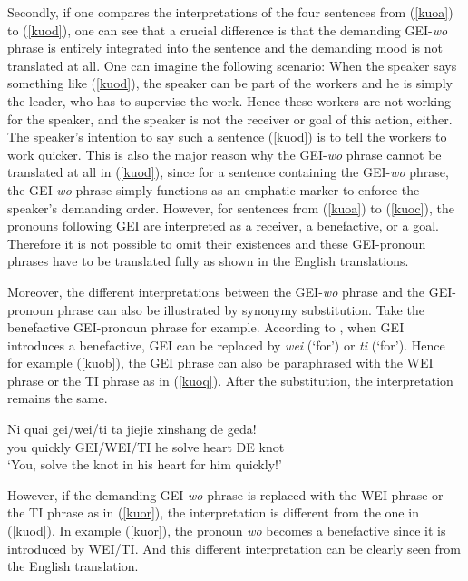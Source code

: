 \documentclass[output=paper,colorlinks,citecolor=brown]{langscibook}
\begin{document}
Secondly, if one compares the interpretations of the four sentences from (\ref{kuoa}) to (\ref{kuod}), one can see that a crucial difference is that the demanding GEI-\textit{wo} phrase is entirely integrated into the sentence and the demanding mood is not translated at all. One can imagine the following scenario: When the speaker says something like (\ref{kuod}), the speaker can be part of the workers and he is simply the leader, who has to supervise the work. Hence these workers are not working for the speaker, and the speaker is not the receiver or goal of this action, either. The speaker's intention to say such a sentence (\ref{kuod}) is to tell the workers to work quicker. This is also the major reason why the GEI-\textit{wo} phrase cannot be translated at all in (\ref{kuod}), since for a sentence containing the GEI-\textit{wo} phrase, the GEI-\textit{wo} phrase simply functions as an emphatic marker to enforce the speaker's demanding order. However, for sentences from (\ref{kuoa}) to (\ref{kuoc}), the pronouns following GEI are interpreted as a receiver, a benefactive, or a goal. Therefore it is not possible to omit their existences and these GEI-pronoun phrases have to be translated fully as shown in the English translations.
 
Moreover, the different interpretations between the GEI-\textit{wo} phrase and the GEI-pronoun phrase can also be illustrated by synonymy substitution. Take the benefactive GEI-pronoun phrase for example. According to \citet{Liu&Pan&Gu}, when GEI introduces a benefactive, GEI can be replaced by \textit{wei} (`for') or \textit{ti} (`for'). Hence for example (\ref{kuob}), the GEI phrase can also be paraphrased with the WEI phrase or the TI phrase as in (\ref{kuoq}). After the substitution, the interpretation remains the same.

\ea
\label{kuoq}
\gll Ni     quai    gei/wei/ti ta  jiejie  xinshang    de  geda!\\  
     you    quickly GEI/WEI/TI he  solve   heart       DE  knot\\ 
\glt `You, solve the knot in his heart for him quickly!'
\z

However, if the demanding GEI-\textit{wo} phrase is replaced with the WEI phrase or the TI phrase as in (\ref{kuor}), the interpretation is different from the one in (\ref{kuod}). In example (\ref{kuor}), the pronoun \textit{wo} becomes a benefactive since it is introduced by WEI/TI. And this different interpretation can be clearly seen from the English translation.
\end{document}
